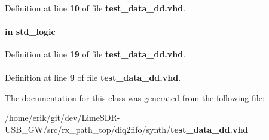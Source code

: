 \paragraph[{numeric\+\_\+std}]{\hspace{0.3cm}{\ttfamily [Package]}}\label{classtest__data__dd_a2edc34402b573437d5f25fa90ba4013e}


Definition at line {\bf 10} of file {\bf test\+\_\+data\+\_\+dd.\+vhd}.

\paragraph[{reset\+\_\+n}]{ {\bfseries \textcolor{keywordflow}{in}\textcolor{vhdlchar}{ }} {\bfseries \textcolor{comment}{std\+\_\+logic}\textcolor{vhdlchar}{ }} \hspace{0.3cm}{\ttfamily [Port]}}\label{classtest__data__dd_a446ea52ed8c4a84181a47d9165ce41a5}


Definition at line {\bf 19} of file {\bf test\+\_\+data\+\_\+dd.\+vhd}.

\paragraph[{std\+\_\+logic\+\_\+1164}]{\hspace{0.3cm}{\ttfamily [Package]}}\label{classtest__data__dd_acd03516902501cd1c7296a98e22c6fcb}


Definition at line {\bf 9} of file {\bf test\+\_\+data\+\_\+dd.\+vhd}.



The documentation for this class was generated from the following file\+:\begin{DoxyCompactItemize}
\item 
/home/erik/git/dev/\+Lime\+S\+D\+R-\/\+U\+S\+B\+\_\+\+G\+W/src/rx\+\_\+path\+\_\+top/diq2fifo/synth/{\bf test\+\_\+data\+\_\+dd.\+vhd}\end{DoxyCompactItemize}
